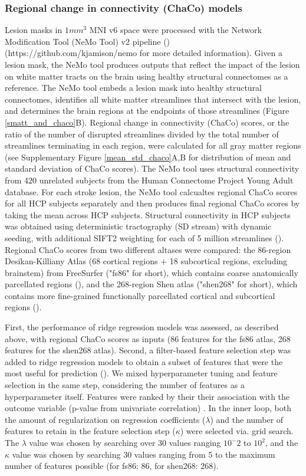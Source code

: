 \documentclass[10pt]{article}
\def\Plus{\texttt{+}}
\begin{document}
\subsubsection*{Regional change in connectivity (ChaCo) models}
Lesion masks in $1mm^3$ MNI v6 space were processed with the Network Modification Tool (NeMo Tool) v2 pipeline (\cite{Kuceyeski2013-nk}) (https://github.com/kjamison/nemo for more detailed information). Given a lesion mask, the NeMo tool produces outputs that reflect the impact of the lesion on white matter tracts on the brain using healthy structural connectomes as a reference. The NeMo tool embeds a lesion mask into healthy structural connectomes, identifies all white matter streamlines that intersect with the lesion, and determines the brain regions at the endpoints of those streamlines (Figure \ref{smatt_and_chaco}B). Regional change in connectivity (ChaCo) scores, or the ratio of the number of disrupted streamlines divided by the total number of streamlines terminating in each region, were calculated for all gray matter regions (see Supplementary Figure \ref{mean_std_chaco}A,B for distribution of mean and standard deviation of ChaCo scores). The NeMo tool uses structural connectivity from 420 unrelated subjects from the Human Connectome Project Young Adult database. For each stroke lesion, the NeMo tool calcualtes regional ChaCo scores for all HCP subjects separately and then produces final regional ChaCo scores by taking the mean across HCP subjects. Structural connectivity in HCP subjects was obtained using deterministic tractography (SD stream) with dynamic seeding, with additional SIFT2 weighting for each of 5 million streamlines (\cite{Smith2015-eb}). Regional ChaCo scores from two different altases were compared: the 86-region Desikan-Killiany Atlas (68 cortical regions $\Plus$ 18 subcortical regions, excluding brainstem) from FreeSurfer ("fs86" for short), which contains coarse anatomically parcellated regions (\cite{Desikan2006-vf,Fischl2002-lb}), and the 268-region Shen atlas ("shen268" for short), which contains more fine-grained functionally parcellated cortical and subcortical regions (\cite{Shen2013-zn}).

First, the performance of ridge regression models was assessed, as described above, with regional ChaCo scores as inputs (86 features for the fs86 atlas, 268 features for the shen268 atlas). Second, a filter-based feature selection step was added to ridge regression models to obtain a subset of features that were the most useful for prediction (\cite{Guyon2003-kj, Hall1999-qr, Pudjihartono2022-zg}). We mixed hyperparameter tuning and feature selection in the same step, considering the number of features as a hyperparameter itself. Features were ranked by their their association with the outcome variable (p-value from univariate correlation) . In the inner loop, both the amount of regularization on regression coefficients ($\lambda$) and the number of features to retain in the feature selection step ($\kappa$) were selected via. grid search. The $\lambda$ value was chosen by searching over 30 values ranging $10^-2$ to $10^2$, and the $\kappa$ value was chosen by searching 30 values ranging from 5 to the maximum number of features possible (for fs86: 86, for shen268: 268). 
\end{document}

